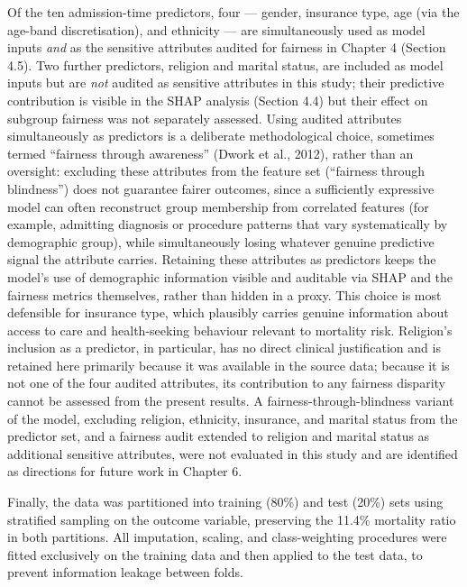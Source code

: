 \documentclass[12pt,a4paper]{report}
\begin{document}
Of the ten admission-time predictors, four --- gender, insurance type, age (via the age-band discretisation), and ethnicity --- are simultaneously used as model inputs \emph{and} as the sensitive attributes audited for fairness in Chapter 4 (Section 4.5). Two further predictors, religion and marital status, are included as model inputs but are \emph{not} audited as sensitive attributes in this study; their predictive contribution is visible in the SHAP analysis (Section 4.4) but their effect on subgroup fairness was not separately assessed. Using audited attributes simultaneously as predictors is a deliberate methodological choice, sometimes termed ``fairness through awareness'' (Dwork et al., 2012), rather than an oversight: excluding these attributes from the feature set (``fairness through blindness'') does not guarantee fairer outcomes, since a sufficiently expressive model can often reconstruct group membership from correlated features (for example, admitting diagnosis or procedure patterns that vary systematically by demographic group), while simultaneously losing whatever genuine predictive signal the attribute carries. Retaining these attributes as predictors keeps the model's use of demographic information visible and auditable via SHAP and the fairness metrics themselves, rather than hidden in a proxy. This choice is most defensible for insurance type, which plausibly carries genuine information about access to care and health-seeking behaviour relevant to mortality risk. Religion's inclusion as a predictor, in particular, has no direct clinical justification and is retained here primarily because it was available in the source data; because it is not one of the four audited attributes, its contribution to any fairness disparity cannot be assessed from the present results. A fairness-through-blindness variant of the model, excluding religion, ethnicity, insurance, and marital status from the predictor set, and a fairness audit extended to religion and marital status as additional sensitive attributes, were not evaluated in this study and are identified as directions for future work in Chapter 6.

Finally, the data was partitioned into training (80\%) and test (20\%) sets using stratified sampling on the outcome variable, preserving the 11.4\% mortality ratio in both partitions. All imputation, scaling, and class-weighting procedures were fitted exclusively on the training data and then applied to the test data, to prevent information leakage between folds.
\end{document}
